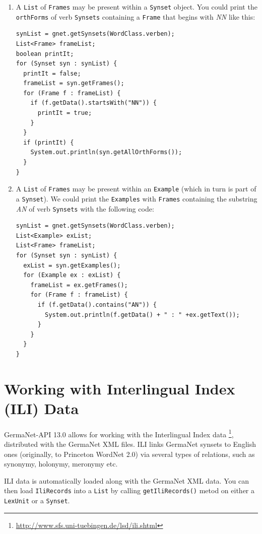 \documentclass[12pt,a4paper,english,utf8]{report}
\begin{document}
\renewcommand{\labelenumi}{\arabic{enumi}}
\begin{enumerate}
	\item A \texttt{List} of \texttt{Frames} may be present within a \texttt{Synset} object. You could print the \texttt{orthForms} of verb \texttt{Synsets} containing a \texttt{Frame} that begins with \emph{NN} like this:
	
\begin{lstlisting}
synList = gnet.getSynsets(WordClass.verben);
List<Frame> frameList;
boolean printIt;
for (Synset syn : synList) {
  printIt = false;
  frameList = syn.getFrames();
  for (Frame f : frameList) {
    if (f.getData().startsWith("NN")) {
      printIt = true;
    }
  }
  if (printIt) {
    System.out.println(syn.getAllOrthForms());
  }
}
\end{lstlisting}

\item A \texttt{List} of \texttt{Frames} may be present within an \texttt{Example} (which in turn is part of a \texttt{Synset}). We could print the \texttt{Examples} with \texttt{Frames} containing the substring \emph{AN} of verb \texttt{Synsets} with the following code:

\begin{lstlisting}
synList = gnet.getSynsets(WordClass.verben);
List<Example> exList;
List<Frame> frameList;
for (Synset syn : synList) {
  exList = syn.getExamples();
  for (Example ex : exList) {
    frameList = ex.getFrames();
    for (Frame f : frameList) {
      if (f.getData().contains("AN")) {
        System.out.println(f.getData() + " : " +ex.getText());
      }
    }
  }
}
\end{lstlisting}

\end{enumerate}



\section{Working with Interlingual Index (ILI) Data}
GermaNet-API 13.0 allows for working with the Interlingual Index data \footnote{\url{http://www.sfs.uni-tuebingen.de/lsd/ili.shtml}}, distributed with the GermaNet XML files. ILI links GermaNet synsets to English ones (originally, to Princeton WordNet 2.0) via several types of relations, such as synonymy, holonymy, meronymy etc. 

ILI data is automatically loaded along with the GermaNet XML data. You can then load \texttt{IliRecords} into a \texttt{List} by calling \texttt{getIliRecords()} metod on either a \texttt{LexUnit} or a \texttt{Synset}. 
\end{document}
